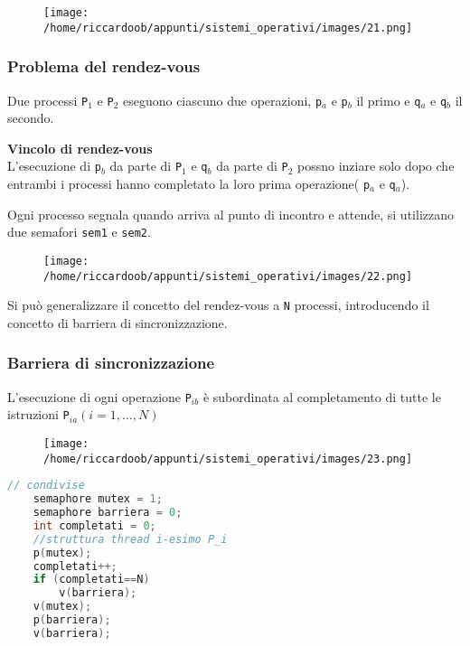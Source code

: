 \begin{figure}[H]
    \centering
    \texttt{[image: /home/riccardoob/appunti/sistemi\_operativi/images/21.png]}
\end{figure}

\subsubsection{Problema del rendez-vous}
Due processi \texttt{P}$_1$ e \texttt{P}$_2$ eseguono ciascuno due operazioni, \texttt{p}$_a$ e \texttt{p}$_b$ il primo e \texttt{q}$_a$ e \texttt{q}$_b$ il secondo.

\begin{mdframed}[topline=false,bottomline=false,rightline=false]
    \textbf{Vincolo di rendez-vous}\\
    L'esecuzione di \texttt{p}$_b$ da parte di \texttt{P}$_1$ e \texttt{q}$_b$ da parte di \texttt{P}$_2$ possno inziare solo dopo che entrambi i processi hanno completato la loro prima operazione( \texttt{p}$_a$ e \texttt{q}$_a$).
\end{mdframed}

Ogni processo segnala quando arriva al punto di incontro e attende, si utilizzano due semafori \texttt{sem1} e \texttt{sem2}.

\begin{figure}[H]
    \centering
    \texttt{[image: /home/riccardoob/appunti/sistemi\_operativi/images/22.png]}
\end{figure}

Si può generalizzare il concetto del rendez-vous a \texttt{N} processi, introducendo il concetto di barriera di sincronizzazione.

\subsubsection{Barriera di sincronizzazione}
L'esecuzione di ogni operazione \texttt{P}$_{ib}$ è subordinata al completamento di tutte le istruzioni \texttt{P}$_{ia} (i=1,\dots,N)$

\begin{figure}[H]
    \centering
    \texttt{[image: /home/riccardoob/appunti/sistemi\_operativi/images/23.png]}
\end{figure}

\begin{lstlisting}[language=C]
    // condivise
    semaphore mutex = 1;
    semaphore barriera = 0;
    int completati = 0;
    //struttura thread i-esimo P_i
    p(mutex);
    completati++;
    if (completati==N)
        v(barriera);
    v(mutex);
    p(barriera);
    v(barriera);
\end{lstlisting}

